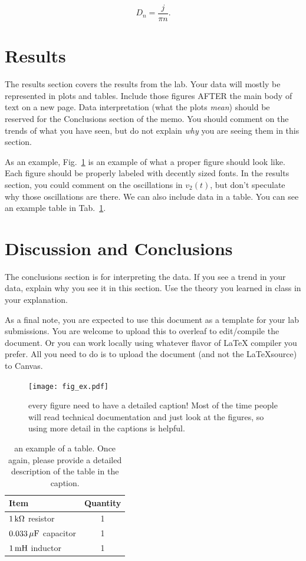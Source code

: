 \documentclass[11pt]{texMemo-gibbons}
\begin{document}
\begin{equation}
  \label{eq:2}
  D_n = \frac{j}{\pi n}.
\end{equation}


\section{Results}
\label{sec:results}

The results section covers the results from the lab.
Your data will mostly be represented in plots and tables.
Include those figures AFTER the main body of text on
a new page.  Data interpretation (what the plots \emph{mean})
should be reserved for the Conclusions section of the
memo.  You should comment on the trends of what you
have seen, but do not explain \emph{why} you are seeing
them in this section.

As an example, Fig.~\ref{fig:ex01} is an example of
what a proper figure should look like.  Each figure
should be properly labeled with decently sized fonts.
In the results section, you could comment  on the oscillations
in $v_2(t)$, but don't speculate why those oscillations
are there.  We can also include data in a table.  You
can see an example table in Tab.~\ref{tab:ex02}.  

\section{Discussion and Conclusions}
\label{sec:conclusions}

The conclusions section is for interpreting the data.
If you see a trend in your data, explain why you see
it in this section.  Use the theory you learned in class
in your explanation.

As a final note, you are expected to use this document
as a template for your lab submissions.  You are welcome
to upload this to overleaf to edit/compile the document.
Or you can work locally using whatever flavor of \LaTeX
compiler you prefer.  All you need to do is to upload
the document (and not the \LaTeX  source) to Canvas.


\clearpage

\begin{figure}[h!]
  \centering
  \texttt{[image: fig\_ex.pdf]}
  \caption{every figure need to have a detailed caption!  Most of the time people will read technical documentation and just look at the figures, so using more detail in the captions is helpful.}
  \label{fig:ex01}
\end{figure}

\begin{table}[h!]
  \centering
  \begin{tabular}{ l | c }
    \textbf{Item} & \textbf{Quantity} \\
    \hline
    $\unit[1]{k\Omega}$ resistor & 1\\
    $\unit[0.033]{\mu F}$ capacitor & 1\\
    $\unit[1]{mH}$ inductor & 1\\
  \end{tabular}
  \caption{an example of a table.  Once again, please provide a detailed description of the table in the caption.}
  \label{tab:ex02}
\end{table}
\end{document}
